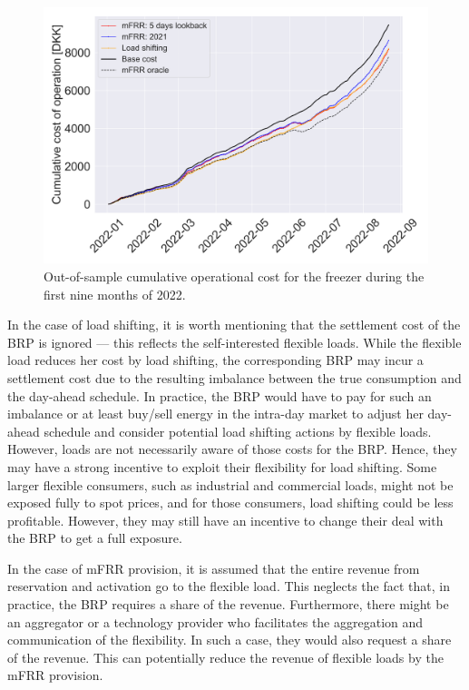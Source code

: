 \begin{figure}[t]
    \centering
    \includegraphics[width=\columnwidth]{../figures/cumulative_cost_comparison.png}
    \caption{Out-of-sample cumulative operational cost for the freezer during the first nine months of 2022.}
    \label{fig:cumulative_cost_comparison}
    \vspace{-2mm}
\end{figure}

In the case of load shifting, it is worth mentioning that the settlement cost of the BRP is ignored --- this reflects the self-interested flexible loads.  While the flexible load reduces her cost by load shifting, the corresponding BRP may incur a settlement cost due to the resulting imbalance between the true consumption and the day-ahead schedule. In practice, the BRP would have to pay for such an imbalance or at least buy/sell energy in the intra-day market to adjust her day-ahead schedule and consider potential load shifting actions by flexible loads. However, loads are not necessarily aware of those costs for the BRP. Hence, they may have a strong incentive to exploit their flexibility for load shifting. Some larger flexible consumers, such as industrial and commercial loads, might not be exposed fully to spot prices, and for those consumers, load shifting could be less profitable. However, they may still have an incentive to change their deal with the BRP to get a full exposure.

In the case of mFRR  provision, it is   assumed that the entire revenue from reservation and activation go to the flexible load. This neglects the fact that, in practice, the BRP requires a share of the revenue. Furthermore, there might be an aggregator or a technology provider who facilitates the aggregation and communication of the flexibility. In such a case, they would also request a share of the revenue. This can potentially reduce the revenue of flexible loads by the mFRR provision.








